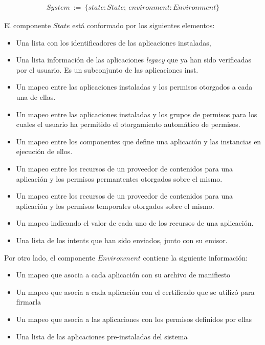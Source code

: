 \begin{align*}
    System\ :=\ \{ state: State;\ environment: Environment \}
\end{align*}


El componente $State$ está conformado por los siguientes elementos:

\begin{itemize}
    \item Una lista con los identificadores de las aplicaciones instaladas,
    \item Una lista  información de las aplicaciones \textit{legacy} que ya han sido verificadas por
          el usuario. Es un subconjunto de las aplicaciones inst.
    \item Un mapeo entre las aplicaciones instaladas y los permisos otorgados a cada una de ellas.
    \item Un mapeo entre las aplicaciones instaladas y los grupos de permisos para los cuales el
          usuario ha permitido el otorgamiento automático de permisos.
    \item Un mapeo entre los componentes que define una aplicación y las instancias en ejecución de
          ellos.
    \item Un mapeo entre los recursos de un proveedor de contenidos para una aplicación y los permisos
          permantentes otorgados sobre el mismo.
    \item Un mapeo entre los recursos de un proveedor de contenidos para una aplicación y los permisos
          temporales otorgados sobre el mismo.
    \item Un mapeo indicando el valor de cada uno de los recursos de una aplicación.
    \item Una lista de los intents que han sido enviados, junto con su emisor.
\end{itemize}

Por otro lado, el componente $Environment$ contiene la siguiente información:

\begin{itemize}
    \item Un mapeo que asocia a cada aplicación con su archivo de manifiesto
    \item Un mapeo que asocia a cada aplicación con el certificado que se utilizó para firmarla
    \item Un mapeo que asocia a las aplicaciones con los permisos definidos por ellas
    \item Una lista de las aplicaciones pre-instaladas del sistema
\end{itemize}

